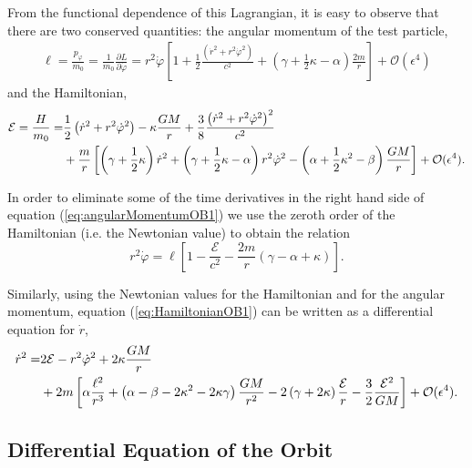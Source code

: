 From the functional dependence of this Lagrangian, it is easy to observe that there are two conserved quantities: the angular momentum of the test particle,
\begin{align}
\ell = \frac{p_\varphi}{m_0} = \frac{1}{m_0} \frac{\partial L}{\partial \dot{\varphi}} = r^2 \dot{\varphi} \left[ 1 + \frac{1}{2} \frac{ \left( \dot{r}^2 + r^2 \dot{\varphi}^2 \right)}{c^2} +\left( \gamma + \frac{1}{2} \kappa - \alpha \right) \frac{2m}{r}   \right]+ \mathcal{O} ( \epsilon ^4 ) \label{eq:angularMomentumOB1}
\end{align}
and the Hamiltonian,
\begin{align}
\mathcal{E} = \frac{H}{m_0} = & \frac{1}{2}  \left( \dot{r}^2 + r^2 \dot{\varphi}^2 \right) - \kappa \frac{GM}{r} + \frac{3}{8}  \frac{\left( \dot{r}^2 + r^2 \dot{\varphi}^2 \right)^2}{c^2} \notag \\
& + \frac{m }{r} \left[ \left( \gamma + \frac{1}{2}\kappa \right)  \dot{r}^2 + \left( \gamma + \frac{1}{2} \kappa - \alpha \right) r^2 \dot{\varphi}^2  -  \left(\alpha + \frac{1}{2} \kappa^2 -\beta \right) \frac{GM}{r} \right] + \mathcal{O} ( \epsilon ^4 ). \label{eq:HamiltonianOB1}
\end{align}

In order to eliminate some of the time derivatives in the right hand side of equation (\ref{eq:angularMomentumOB1}) we use the zeroth order of the Hamiltonian (i.e. the Newtonian value) to obtain the relation
\begin{equation}
r^2 \dot{\varphi} = \ell \left[ 1 - \frac{\mathcal{E}}{c^2} - \frac{2m}{r} \left( \gamma - \alpha +\kappa \right) \right]. \label{eq:dotVarphiOB1}
\end{equation}

Similarly, using the Newtonian values for the Hamiltonian and for the angular momentum, equation (\ref{eq:HamiltonianOB1}) can be written as a differential equation for $\dot{r}$,
\begin{align}
\dot{r}^2 = &2\mathcal{E} - r^2 \dot{\varphi}^2 + 2\kappa \frac{GM}{r}  \notag \\
 & + 2m \left[ \alpha \frac{\ell ^2}{r^3} +  \left( \alpha - \beta - 2\kappa^2  - 2\kappa \gamma \right) \frac{GM}{r^2} - 2 \left( \gamma + 2\kappa \right) \frac{\mathcal{E}}{r} - \frac{3}{2}\frac{\mathcal{E} ^2}{GM} \right]  + \mathcal{O} ( \epsilon ^4 ).
\end{align}

\subsection{Differential Equation of the Orbit}


